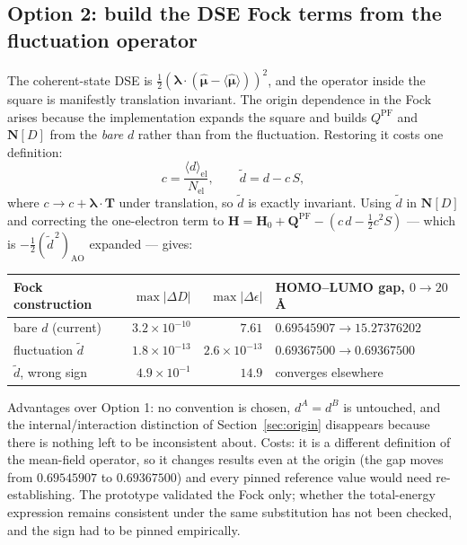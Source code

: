 \documentclass[11pt]{article}
\newcommand{\lam}{\bm{\lambda}}
\newcommand{\dexp}{\langle d \rangle}
\begin{document}
\subsection{Option 2: build the DSE Fock terms from the fluctuation operator}

The coherent-state DSE is $\tfrac12(\lam\cdot(\hat{\bm\mu}-\langle\hat{\bm\mu}
\rangle))^2$, and the operator inside the square is manifestly translation
invariant. The origin dependence in the Fock arises because the implementation
expands the square and builds $Q^{\mathrm{PF}}$ and $\bm{N}[D]$ from the
\emph{bare} $d$ rather than from the fluctuation. Restoring it costs one
definition:
\begin{equation}
c = \frac{\dexp_{\mathrm{el}}}{N_{\mathrm{el}}},
\qquad
\tilde{d} = d - c\,S ,
\label{eq:fluct}
\end{equation}
where $c \to c + \lam\cdot\bm{T}$ under translation, so $\tilde d$ is exactly
invariant. Using $\tilde d$ in $\bm{N}[D]$ and correcting the one-electron term
to $\bm{H} = \bm{H}_0 + \bm{Q}^{\mathrm{PF}} - (c\,d - \tfrac12 c^2 S)$ --- which
is $-\tfrac12(\tilde d^{\,2})_{\mathrm{AO}}$ expanded --- gives:

\begin{center}
\small
\begin{tabular}{lrrl}
\toprule
Fock construction & $\max|\Delta D|$ & $\max|\Delta\epsilon|$ & HOMO--LUMO gap, $0 \to 20$\,\AA \\
\midrule
bare $d$ (current) & $3.2\times10^{-10}$ & $7.61$ & $0.69545907 \to 15.27376202$ \\
fluctuation $\tilde d$ & $1.8\times10^{-13}$ & $2.6\times10^{-13}$ & $0.69367500 \to 0.69367500$ \\
$\tilde d$, wrong sign & $4.9\times10^{-1}$ & $14.9$ & converges elsewhere \\
\bottomrule
\end{tabular}
\end{center}

\noindent
Advantages over Option 1: no convention is chosen, $d^A = d^B$ is untouched, and
the internal/interaction distinction of Section~\ref{sec:origin} disappears
because there is nothing left to be inconsistent about. Costs: it is a different
definition of the mean-field operator, so it changes results even at the origin
(the gap moves from $0.69545907$ to $0.69367500$) and every pinned reference
value would need re-establishing. The prototype validated the Fock only; whether
the total-energy expression remains consistent under the same substitution has
not been checked, and the sign had to be pinned empirically.
\end{document}
